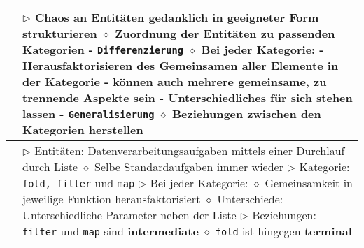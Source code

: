 	\begin{longtable}{ | p{} p{} | } 
	\hline 
	
	\makecell[l]{Abstraktion} & \makecell[l]{
	$\triangleright$ Chaos an Entitäten gedanklich in geeigneter Form strukturieren \\
	\hspace{0.4cm} $\diamond$ Zuordnung der Entitäten zu passenden Kategorien \\
	\hspace{0.6cm} - \texttt{Differenzierung} \\
	\hspace{0.4cm} $\diamond$ Bei jeder Kategorie: \\
	\hspace{0.6cm} - Herausfaktorisieren des Gemeinsamen aller Elemente in der Kategorie \\
	\hspace{0.6cm} - können auch mehrere gemeinsame, zu trennende Aspekte sein \\
	\hspace{0.6cm} - Unterschiedliches für sich stehen lassen \\
	\hspace{0.6cm} - \texttt{Generalisierung} \\
	\hspace{0.4cm} $\diamond$ Beziehungen zwischen den Kategorien herstellen} \\ \hline  
	
	\makecell[l]{Beispiel Racket} & \makecell[l]{
	$\triangleright$ Entitäten: Datenverarbeitungsaufgaben mittels einer Durchlauf durch Liste \\
	\hspace{0.4cm} $\diamond$ Selbe Standardaufgaben immer wieder \\
	$\triangleright$ Kategorie: \texttt{fold, filter} und \texttt{map} \\
	$\triangleright$ Bei jeder Kategorie: \\
	\hspace{0.4cm} $\diamond$ Gemeinsamkeit in jeweilige Funktion herausfaktorisiert \\
	\hspace{0.4cm} $\diamond$ Unterschiede: Unterschiedliche Parameter neben der Liste \\
	$\triangleright$ Beziehungen: \texttt{filter} und \texttt{map} sind \textbf{intermediate} \\
	\hspace{0.4cm} $\diamond$ \texttt{fold} ist hingegen \textbf{terminal}} \\ \hline


\end{longtable}
